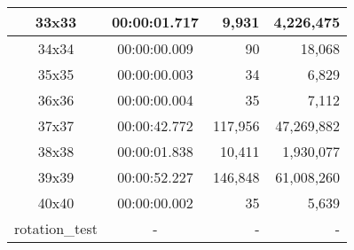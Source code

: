 \begin{center}
\begin{tabular}{|c|c|r|r|}
		33x33 & 00:00:01.717 & 9,931 & 4,226,475 \\ \hline
		34x34 & 00:00:00.009 & 90 & 18,068 \\ \hline
		35x35 & 00:00:00.003 & 34 & 6,829 \\ \hline
		36x36 & 00:00:00.004 & 35 & 7,112 \\ \hline
		37x37 & 00:00:42.772 & 117,956 & 47,269,882 \\ \hline
		38x38 & 00:00:01.838 & 10,411 & 1,930,077 \\ \hline
		39x39 & 00:00:52.227 & 146,848 & 61,008,260 \\ \hline
		40x40 & 00:00:00.002 & 35 & 5,639 \\ \hline
		rotation\_test & - & - & - \\ \hline

    \end{tabular}
\end{center}
